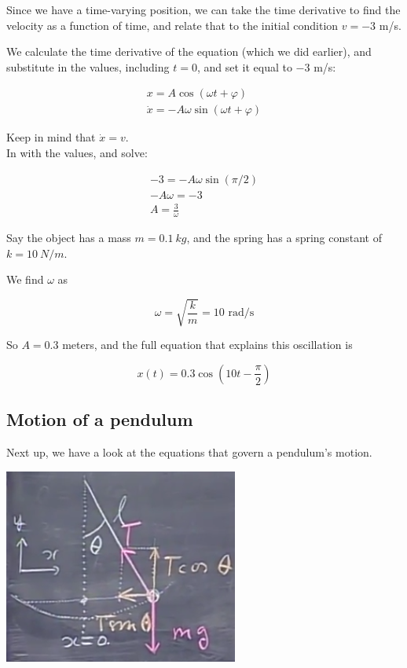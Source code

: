 \documentclass[12pt,a4paper]{report}
\begin{document}
Since we have a time-varying position, we can take the time derivative to find the velocity as a function of time, and relate that to the initial condition $v = -3$ m/s.

We calculate the time derivative of the equation (which we did earlier), and substitute in the values, including $t = 0$, and set it equal to $-3$ m/s:

\begin{align}
x = A \cos(\omega t + \varphi)\\
\dot{x} = -A \omega \sin(\omega t + \varphi)
\end{align}

Keep in mind that $\dot{x} = v$.\\
In with the values, and solve:

\begin{align}
-3 = -A \omega \sin(\pi/2)\\
-A \omega = -3\\
A = \frac{3}{\omega}
\end{align}

Say the object has a mass $m = \SI{0.1}{kg}$, and the spring has a spring constant of $k = \SI{10}{N/m}$.

We find $\omega$ as

\begin{equation}
\omega = \sqrt{\frac{k}{m}} = 10 \text{ rad/s}
\end{equation}

So $A = 0.3$ meters, and the full equation that explains this oscillation is

\begin{equation}
x(t) = 0.3 \cos(10 t - \frac{\pi}{2})
\end{equation}

\subsection{Motion of a pendulum}

Next up, we have a look at the equations that govern a pendulum's motion.

\begin{center}
\includegraphics[scale=0.7]{Graphics/lec10_pendulum}
\end{center}
\end{document}
